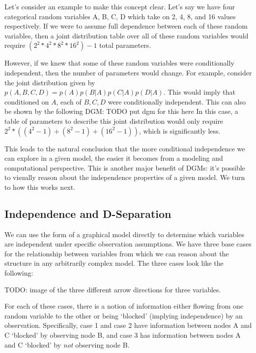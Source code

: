 Let's consider an example to make this concept clear. Let's say we have four categorical random variables A, B, C, D which take on 2, 4, 8, and 16 values respectively. If we were to assume full dependence between each of these random variables, then a joint distribution table over all of these random variables would require $(2^2 * 4^2 * 8^2 * 16^2) - 1$ total parameters.


However, if we knew that some of these random variables were conditionally independent, then the number of parameters would change. For example, consider the joint distribution given by $p(A, B, C, D) = p(A)p(B|A)p(C|A)p(D|A)$. This would imply that conditioned on $A$, each of $B, C, D$ were conditionally independent. This can also be shown by the following DGM:
TODO put dgm for this here
In this case, a table of parameters to describe this joint distribution would only require $2^2 * ((4^2 - 1) + (8^2 - 1) + (16^2 - 1))$, which is significantly less.

This leads to the natural conclusion that the more conditional independence we can explore in a given model, the easier it becomes from a modeling and computational perspective. This is another major benefit of DGMs: it's possible to visually reason about the independence properties of a given model. We turn to how this works next.

\subsection{Independence and D-Separation}
We can use the form of a graphical model directly to determine which variables are independent under specific observation assumptions. We have three base cases for the relationship between variables from which we can reason about the structure in any arbitrarily complex model. The three cases look like the following:

TODO: image of the three different arrow directions for three variables.

For each of these cases, there is a notion of information either flowing from one random variable to the other or being `blocked' (implying independence) by an observation. Specifically, case 1 and case 2 have information between nodes A and C `blocked' by observing node B, and case 3 has information between nodes A and C `blocked' by \textit{not} observing node B.

